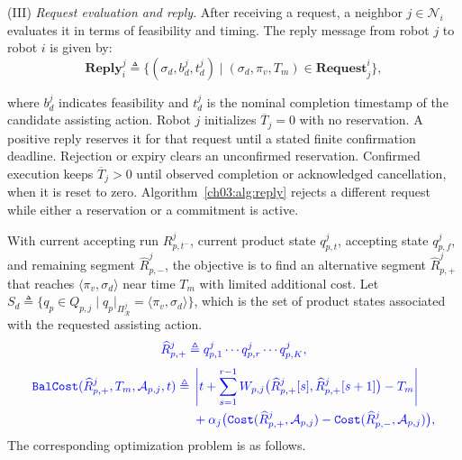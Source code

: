 (III) \emph{Request evaluation and reply}.
After receiving a request, a neighbor
$j \in \mathcal{N}_i$ evaluates it in terms of feasibility and timing. The
reply message from robot $j$ to robot $i$ is given by:
\begin{equation}
\label{ch03:eq:reply}
\textbf{Reply}_i^j \triangleq
\{(\sigma_d,b_d^j,t_d^j) \mid
  (\sigma_d,\pi_v,T_m) \in \textbf{Request}_j^i\},
\end{equation}
\begin{revision}
where $b_d^j$ indicates feasibility and $t_d^j$ is the nominal completion
timestamp of the candidate assisting action. Robot $j$ initializes
$\overline{T}_j=0$ with no reservation. A positive reply reserves it for
that request until a stated finite confirmation deadline. Rejection or
expiry clears an unconfirmed reservation. Confirmed execution keeps
$\overline{T}_j>0$ until observed completion or acknowledged cancellation,
when it is reset to zero. Algorithm~\ref{ch03:alg:reply} rejects a different
request while either a reservation or a commitment is active.
\end{revision} With current accepting
run $R_{p,t^-}^j$, current product state $q_{p,t}^j$, accepting state
$q_{p,f}^j$, and remaining segment
$\widehat{R}_{p,-}^j$, the objective is to find an alternative segment
$\widehat{R}_{p,+}^j$ that reaches $\langle \pi_v,\sigma_d \rangle$ near time
$T_m$ with limited additional cost.
Let
$S_d \triangleq
\{q_p \in Q_{p,j} \mid
  q_p|_{\Pi_{\mathcal{R}}^j}=\langle \pi_v,\sigma_d \rangle\}$,
which is the set of product states associated with the requested assisting
action. 
\begin{equation}
\color{blue}
\label{ch03:segment}
\widehat{R}_{p,+}^j\triangleq
q_{p,1}^j\cdots q_{p,r}^j\cdots q_{p,K}^j,
\end{equation}
\begin{equation}
\color{blue}
\label{ch03:balanced}
\begin{aligned}
\texttt{BalCost}(\widehat{R}_{p,+}^j,T_m,\mathcal{A}_{p,j},t)
\triangleq\;&
\left|
t+\sum_{s=1}^{r-1} W_{p,j}\big(\widehat{R}_{p,+}^j[s],\widehat{R}_{p,+}^j[s+1]\big)
- T_m
\right| \\
& + \alpha_j \big(
\texttt{Cost}(\widehat{R}_{p,+}^j,\mathcal{A}_{p,j})
-\texttt{Cost}(\widehat{R}_{p,-}^j,\mathcal{A}_{p,j})
\big),
\end{aligned}
\end{equation}
The corresponding optimization problem is as follows.

